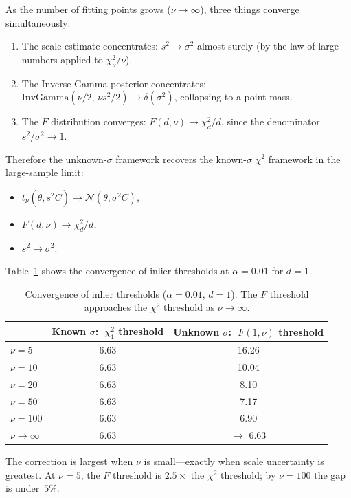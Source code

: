 \documentclass[11pt]{article}
\newcommand{\Normal}{\mathcal{N}}
\newcommand{\InvGamma}{\mathrm{InvGamma}}
\begin{document}
As the number of fitting points grows ($\nu \to \infty$), three things
converge simultaneously:
\begin{enumerate}
\item The scale estimate concentrates: $s^2 \to \sigma^2$ almost surely
  (by the law of large numbers applied to $\chi^2_\nu / \nu$).
\item The Inverse-Gamma posterior concentrates:
  $\InvGamma(\nu/2,\, \nu s^2/2) \to \delta(\sigma^2)$,
  collapsing to a point mass.
\item The $F$ distribution converges: $F(d, \nu) \to \chi^2_d / d$,
  since the denominator $s^2/\sigma^2 \to 1$.
\end{enumerate}
Therefore the unknown-$\sigma$ framework recovers the known-$\sigma$
$\chi^2$ framework in the large-sample limit:
\begin{itemize}
  \item $t_\nu(\hat\theta, s^2 C) \to \Normal(\theta, \sigma^2 C)$,
  \item $F(d, \nu) \to \chi^2_d / d$,
  \item $s^2 \to \sigma^2$.
\end{itemize}

Table~\ref{tab:thresholds} shows the convergence of inlier thresholds
at $\alpha = 0.01$ for $d = 1$.

\begin{table}[h]
\centering
\begin{tabular}{lcc}
  \toprule
  & Known $\sigma$: $\;\chi^2_1$ threshold & Unknown $\sigma$: $\;F(1,\nu)$ threshold \\
  \midrule
  $\nu = 5$   & 6.63 & 16.26 \\
  $\nu = 10$  & 6.63 & 10.04 \\
  $\nu = 20$  & 6.63 & 8.10 \\
  $\nu = 50$  & 6.63 & 7.17 \\
  $\nu = 100$ & 6.63 & 6.90 \\
  $\nu \to \infty$ & 6.63 & $\to$ 6.63 \\
  \bottomrule
\end{tabular}
\caption{Convergence of inlier thresholds ($\alpha = 0.01$, $d = 1$).
  The $F$ threshold approaches the $\chi^2$ threshold as $\nu \to \infty$.}
\label{tab:thresholds}
\end{table}

\noindent The correction is largest when $\nu$ is small---exactly when
scale uncertainty is greatest.  At $\nu = 5$, the $F$ threshold is
$2.5\times$ the $\chi^2$ threshold; by $\nu = 100$ the gap is under~$5\%$.
\end{document}
